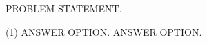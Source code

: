 \documentclass[test, recordsfile={records.lua}]{practice}
\begin{document}
\begin{question}
PROBLEM STATEMENT.
\begin{tasks}(1)
  \task ANSWER OPTION.
  \task ANSWER OPTION.
\end{tasks}
\end{question}
\end{document}
